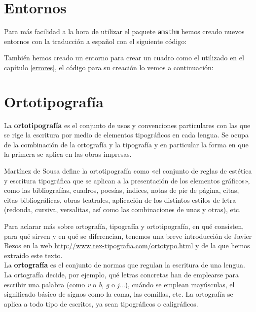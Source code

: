 
\section{Entornos}

Para más facilidad a la hora de utilizar el paquete \verb|amsthm| hemos creado nuevos entornos con la traducción a español con el siguiente código:


También hemos creado un entorno para crear un cuadro como el utilizado en el capítulo \ref{errores}, el código para su creación lo vemos a continuación:













\section{Ortotipografía}\label{sec:ortotip}

La \textbf{ortotipografía} es el conjunto de usos y convenciones particulares con las que se rige la escritura por medio de elementos tipográficos en cada lengua. Se ocupa de la combinación de la ortografía y la tipografía y en particular la forma en que la primera se aplica en las obras impresas.

Martínez de Sousa \cite{desousa} define la ortotipografía como «el conjunto de reglas de estética y escritura tipográfica que se aplican a la presentación de los elementos gráficos», como las bibliografías, cuadros, poesías, índices, notas de pie de página, citas, citas bibliográficas, obras teatrales, aplicación de los distintos estilos de letra (redonda, cursiva, versalitas, así como las combinaciones de unas y otras), etc.

Para aclarar más sobre ortografía, tipografía y ortotipografía,  en qué consisten, para qué sirven y en qué se diferencian, tenemos una breve introducción de Javier Bezos en la web \url{http://www.tex-tipografia.com/ortotypo.html} y de la que hemos extraido este texto.\\

La \textbf{ortografía} es el conjunto de normas que regulan la escritura de una lengua. La ortografía decide, por ejemplo, qué letras concretas han de emplearse para escribir una palabra (como \textit{v} o \textit{b}, \textit{g} o \textit{j}...), cuándo se emplean mayúsculas, el significado básico de signos como la coma, las comillas, etc. La ortografía se aplica a todo tipo de escritos, ya sean tipográficos o caligráficos.\\

